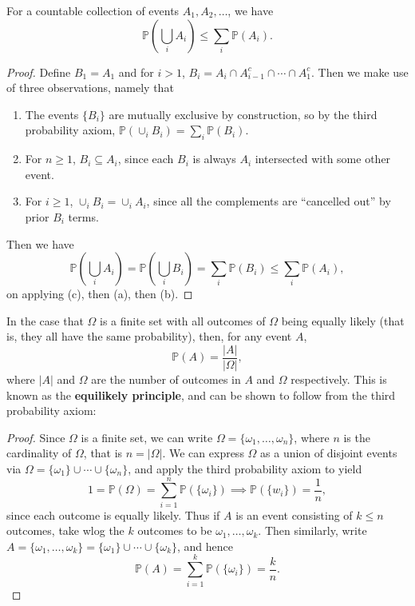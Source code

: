\begin{lemma}
    For a countable collection of events $A_1, A_2, \dots$, we have
    \[
        \mathbb{P}\left( \bigcup_i A_i \right) \leq \sum_i \mathbb{P}\left( A_i \right)
    .\]
\end{lemma}
\begin{proof}
    Define $B_1 = A_1$ and for $i > 1$, $B_i = A_i \cap A_{i-1}^c \cap \cdots \cap A_1^c$. Then we make use of three observations, namely that
    \begin{enumerate}[label=(\alph*)]
        \item The events $\{B_i\}$ are mutually exclusive by construction, so by the third probability axiom, $\mathbb{P}(\cup_i B_i) = \sum_{i}\mathbb{P}(B_i)$.
        \item For $n \geq 1$, $B_i \subseteq A_i$, since each $B_i$ is always $A_i$ intersected with some other event.
        \item For $i \geq 1$, $\cup_i B_i = \cup_i A_i$, since all the complements are ``cancelled out'' by prior $B_i$ terms.
    \end{enumerate}
    Then we have
    \[
        \mathbb{P}\left( \bigcup_i A_i \right) = \mathbb{P}\left( \bigcup_i B_i \right) = \sum_i \mathbb{P}(B_i) \leq \sum_i \mathbb{P}(A_i)
    ,\]
    on applying (c), then (a), then (b).
\end{proof}

In the case that $\Omega$ is a finite set with all outcomes of $\Omega$ being equally likely (that is, they all have the same probability), then, for any event $A$,
\[
    \mathbb{P}(A) = \frac{|A|}{|\Omega|}
,\]
where $|A|$ and $\Omega$ are the number of outcomes in $A$ and $\Omega$ respectively. This is known as the \textbf{equilikely principle}, and can be shown to follow from the third probability axiom:

\begin{proof}
    Since $\Omega$ is a finite set, we can write $\Omega = \{\omega_1, \dots, \omega_n\}$, where $n$ is the cardinality of $\Omega$, that is $n = |\Omega|$. We can express $\Omega$ as a union of disjoint events via $\Omega = \{\omega_1\} \cup \cdots \cup \{\omega_n\}$, and apply the third probability axiom to yield
    \[
        1 = \mathbb{P}(\Omega) = \sum_{i=1}^{n}\mathbb{P}(\{\omega_i\}) \implies \mathbb{P}(\{w_i\}) = \frac{1}{n}
    ,\]
    since each outcome is equally likely. Thus if $A$ is an event consisting of $k \leq n$ outcomes, take wlog the $k$ outcomes to be $\omega_1, \dots, \omega_k$. Then similarly, write $A = \{\omega_1, \dots, \omega_k\} = \{\omega_1\} \cup \cdots \cup \{\omega_k\}$, and hence
    \[
        \mathbb{P}(A) = \sum_{i=1}^{k}\mathbb{P}(\{\omega_i\}) = \frac{k}{n}
    .\]
\end{proof}


